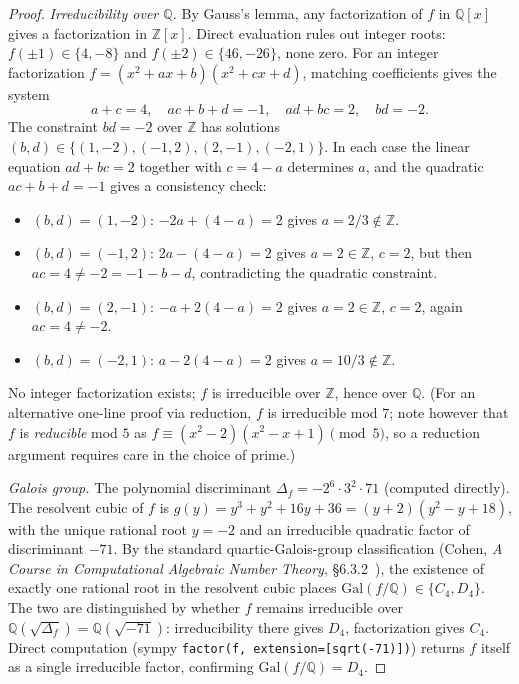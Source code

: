 \documentclass[11pt,reqno]{amsart}
\theoremstyle{plain}
\theoremstyle{definition}
\theoremstyle{remark}
\newcommand{\Z}{\mathbb{Z}}
\newcommand{\Q}{\mathbb{Q}}
\begin{document}
\begin{proof}
\textit{Irreducibility over $\Q$.} By Gauss's lemma, any
factorization of $f$ in $\Q[x]$ gives a factorization in
$\Z[x]$. Direct evaluation rules out integer roots:
$f(\pm 1) \in \{4, -8\}$ and $f(\pm 2) \in \{46, -26\}$, none
zero. For an integer factorization
$f = (x^{2} + ax + b)(x^{2} + cx + d)$, matching coefficients
gives the system
\[
  a + c = 4,\quad ac + b + d = -1,\quad
  ad + bc = 2,\quad bd = -2.
\]
The constraint $bd = -2$ over $\Z$ has solutions
$(b, d) \in \{(1, -2), (-1, 2), (2, -1), (-2, 1)\}$. In each
case the linear equation $ad + bc = 2$ together with $c = 4 - a$
determines $a$, and the quadratic $ac + b + d = -1$ gives a
consistency check:
\begin{itemize}\setlength\itemsep{0pt}
\item $(b, d) = (1, -2)$: $-2a + (4 - a) = 2$ gives $a = 2/3
\notin \Z$.
\item $(b, d) = (-1, 2)$: $2a - (4 - a) = 2$ gives $a = 2 \in \Z$,
$c = 2$, but then $ac = 4 \neq -2 = -1 - b - d$, contradicting
the quadratic constraint.
\item $(b, d) = (2, -1)$: $-a + 2(4 - a) = 2$ gives $a = 2 \in \Z$,
$c = 2$, again $ac = 4 \neq -2$.
\item $(b, d) = (-2, 1)$: $a - 2(4 - a) = 2$ gives $a = 10/3
\notin \Z$.
\end{itemize}
No integer factorization exists; $f$ is irreducible over $\Z$,
hence over $\Q$. (For an alternative one-line proof via
reduction, $f$ is irreducible mod $7$; note however that $f$ is
\emph{reducible} mod $5$ as
$f \equiv (x^{2} - 2)(x^{2} - x + 1) \pmod{5}$, so a reduction
argument requires care in the choice of prime.)

\textit{Galois group.} The polynomial discriminant
$\Delta_{f} = -2^{6}\cdot 3^{2}\cdot 71$ (computed directly).
The resolvent cubic of $f$ is $g(y) = y^{3} + y^{2} + 16y + 36
= (y + 2)(y^{2} - y + 18)$, with the unique rational root
$y = -2$ and an irreducible quadratic factor of discriminant
$-71$. By the standard quartic-Galois-group classification (Cohen,
\textit{A Course in Computational Algebraic Number Theory},
\S6.3.2~\cite{Cohen1993}), the existence of exactly one rational
root in the resolvent cubic places
$\mathrm{Gal}(f/\Q)\in\{C_{4}, D_{4}\}$. The two are
distinguished by whether $f$ remains irreducible over
$\Q(\sqrt{\Delta_{f}}) = \Q(\sqrt{-71})$: irreducibility there
gives $D_{4}$, factorization gives $C_{4}$. Direct computation
(sympy \texttt{factor(f, extension=[sqrt(-71)])}) returns $f$
itself as a single irreducible factor, confirming
$\mathrm{Gal}(f/\Q) = D_{4}$.


\end{proof}
\end{document}
